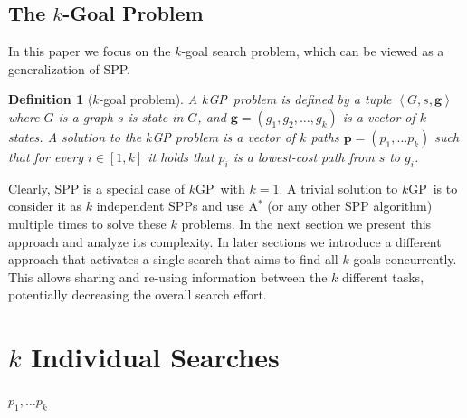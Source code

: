 \documentclass{aicom2e}
\newtheorem{definition}{Definition}
\newcommand{\kgs}{$k$GP}
\newcommand{\astar}{A$^*$}
\newcommand{\kxastar}{k$\times$A$^*$}
\newcommand{\tuple}[1]{\ensuremath{\left \langle #1 \right \rangle }}
\begin{document}
\subsection{The $k$-Goal Problem}

In this paper we focus on the $k$-goal search problem, which can be viewed as
a generalization of SPP.



\begin{definition}[$k$-goal problem]
A \kgs\ problem is defined by a tuple $\tuple{G,s, \textbf{g}}$ where $G$ is a
graph $s$ is state in $G$, and $\textbf{g}=(g_1,g_2,\ldots,g_k)$ is a vector of
$k$ states. A solution to the \kgs{} problem is a vector of $k$ paths
$\textbf{p}=(p_1,\ldots p_k)$ such that for every  $i\in [1,k]$ it holds that
$p_i$ is a lowest-cost path from $s$ to $g_i$. \label{def:k-goal}
\end{definition}



Clearly, SPP is a special case of \kgs\ with $k=1$. A trivial solution to \kgs\
is to consider it as $k$ independent SPPs and use \astar{} (or any other SPP
algorithm) multiple times to solve these $k$ problems. In the next section we
present this approach and analyze its complexity. In later sections we
introduce a different approach that activates a single search that aims to find
all $k$ goals concurrently. This allows sharing and re-using information
between the $k$ different tasks, potentially decreasing the overall search
effort.


\section{$k$ Individual Searches}
\label{sec:k-one-goal}
\begin{algorithm2e}[t!]
    \small
    \For{$i$=1 to $k$}{
        $p_i\gets$ \astar{}($s$,$g_i$)\\
    }
    \Return $p_1,\ldots p_k$\\
    \caption{\kxastar{}: \kgs{} with $k$ \astar{}s}
    \label{alg:k-searches}
\end{algorithm2e}
\end{document}
